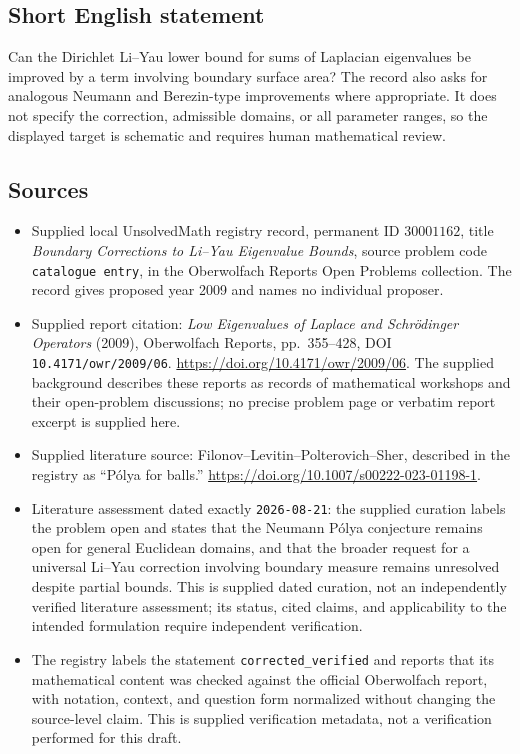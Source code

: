 \documentclass[11pt]{article}
\begin{document}
\subsection{Short English statement}
Can the Dirichlet Li--Yau lower bound for sums of Laplacian eigenvalues be improved by a term involving boundary surface area? The record also asks for analogous Neumann and Berezin-type improvements where appropriate. It does not specify the correction, admissible domains, or all parameter ranges, so the displayed target is schematic and requires human mathematical review.
\subsection{Sources}
\begin{itemize}
\item Supplied local UnsolvedMath registry record, permanent ID \(30001162\), title \emph{Boundary Corrections to Li--Yau Eigenvalue Bounds}, source problem code \texttt{catalogue entry}, in the Oberwolfach Reports Open Problems collection. The record gives proposed year 2009 and names no individual proposer.
\item Supplied report citation: \emph{Low Eigenvalues of Laplace and Schrödinger Operators} (2009), Oberwolfach Reports, pp.\ 355--428, DOI \texttt{10.4171/owr/2009/06}. \url{https://doi.org/10.4171/owr/2009/06}. The supplied background describes these reports as records of mathematical workshops and their open-problem discussions; no precise problem page or verbatim report excerpt is supplied here.
\item Supplied literature source: Filonov--Levitin--Polterovich--Sher, described in the registry as ``Pólya for balls.'' \url{https://doi.org/10.1007/s00222-023-01198-1}.
\item Literature assessment dated exactly \texttt{2026-08-21}: the supplied curation labels the problem open and states that the Neumann Pólya conjecture remains open for general Euclidean domains, and that the broader request for a universal Li--Yau correction involving boundary measure remains unresolved despite partial bounds. This is supplied dated curation, not an independently verified literature assessment; its status, cited claims, and applicability to the intended formulation require independent verification.
\item The registry labels the statement \texttt{corrected\_verified} and reports that its mathematical content was checked against the official Oberwolfach report, with notation, context, and question form normalized without changing the source-level claim. This is supplied verification metadata, not a verification performed for this draft.
\end{itemize}
\end{document}
